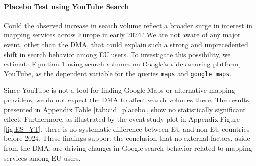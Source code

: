 \documentclass[11pt]{article}
\begin{document}
	
	
	\clearpage
	
	
	\paragraph{Placebo Test using YouTube Search} \label{subsec:placebo}
	
	Could the observed increase in search volume reflect a broader surge in interest in mapping services across Europe in early 2024? We are not aware of any major event, other than the DMA, that could explain such a strong and unprecedented shift in search behavior among EU users. To investigate this possibility, we estimate Equation 1 using search volumes on Google's video-sharing platform, YouTube, as the dependent variable for the queries \texttt{maps} and \texttt{google maps}.
	
	Since YouTube is not a tool for finding Google Maps or alternative mapping providers, we do not expect the DMA to affect search volumes there. The results, presented in Appendix Table \ref{tab:did_placebo}, show no statistically significant effect. Furthermore, as illustrated by the event study plot in Appendix Figure \ref{fig:ES_YT}, there is no systematic difference between EU and non-EU countries before 2024. These findings support the conclusion that no external factors, aside from the DMA, are driving changes in Google search behavior related to mapping services among EU users.
	
	
	
\end{document}
